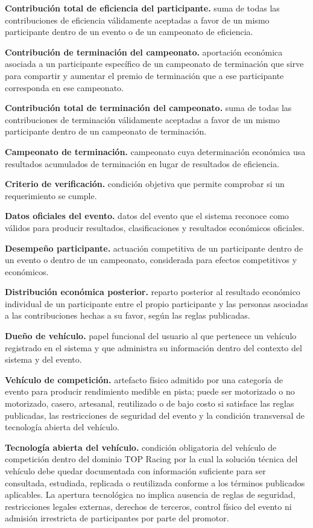 \documentclass[10pt,letterpaper]{article}
\begin{document}
\noindent\textbf{Contribución total de eficiencia del participante.} suma de todas las contribuciones de eficiencia válidamente aceptadas a favor de un mismo participante dentro de un evento o de un campeonato de eficiencia.\par
\noindent\textbf{Contribución de terminación del campeonato.} aportación económica asociada a un participante específico de un campeonato de terminación que sirve para compartir y aumentar el premio de terminación que a ese participante corresponda en ese campeonato.\par
\noindent\textbf{Contribución total de terminación del campeonato.} suma de todas las contribuciones de terminación válidamente aceptadas a favor de un mismo participante dentro de un campeonato de terminación.\par
\noindent\textbf{Campeonato de terminación.} campeonato cuya determinación económica usa resultados acumulados de terminación en lugar de resultados de eficiencia.\par
\noindent\textbf{Criterio de verificación.} condición objetiva que permite comprobar si un requerimiento se cumple.\par
\noindent\textbf{Datos oficiales del evento.} datos del evento que el sistema reconoce como válidos para producir resultados, clasificaciones y resultados económicos oficiales.\par
\noindent\textbf{Desempeño participante.} actuación competitiva de un participante dentro de un evento o dentro de un campeonato, considerada para efectos competitivos y económicos.\par
\noindent\textbf{Distribución económica posterior.} reparto posterior al resultado económico individual de un participante entre el propio participante y las personas asociadas a las contribuciones hechas a su favor, según las reglas publicadas.\par
\noindent\textbf{Dueño de vehículo.} papel funcional del usuario al que pertenece un vehículo registrado en el sistema y que administra su información dentro del contexto del sistema y del evento.\par
\noindent\textbf{Vehículo de competición.} artefacto físico admitido por una categoría de evento para producir rendimiento medible en pista; puede ser motorizado o no motorizado, casero, artesanal, reutilizado o de bajo costo si satisface las reglas publicadas, las restricciones de seguridad del evento y la condición transversal de tecnología abierta del vehículo.\par
\noindent\textbf{Tecnología abierta del vehículo.} condición obligatoria del vehículo de competición dentro del dominio TOP Racing por la cual la solución técnica del vehículo debe quedar documentada con información suficiente para ser consultada, estudiada, replicada o reutilizada conforme a los términos publicados aplicables. La apertura tecnológica no implica ausencia de reglas de seguridad, restricciones legales externas, derechos de terceros, control físico del evento ni admisión irrestricta de participantes por parte del promotor.\par
\end{document}
